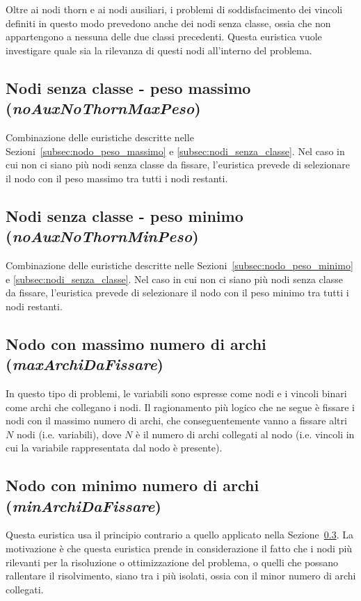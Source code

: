Oltre ai nodi thorn e ai nodi ausiliari, i problemi di soddisfacimento dei vincoli definiti in questo modo prevedono anche dei nodi senza classe, ossia che non appartengono a nessuna delle due classi precedenti. Questa euristica vuole investigare quale sia la rilevanza di questi nodi all'interno del problema.

\subsection{Nodi senza classe - peso massimo (\textit{noAuxNoThornMaxPeso})}

Combinazione delle euristiche descritte nelle Sezioni~\ref{subsec:nodo_peso_massimo} e \ref{subsec:nodi_senza_classe}. Nel caso in cui non ci siano più nodi senza classe da fissare, l'euristica prevede di selezionare il nodo con il peso massimo tra tutti i nodi restanti.

\subsection{Nodi senza classe - peso minimo (\textit{noAuxNoThornMinPeso})}

Combinazione delle euristiche descritte nelle Sezioni~\ref{subsec:nodo_peso_minimo} e \ref{subsec:nodi_senza_classe}. Nel caso in cui non ci siano più nodi senza classe da fissare, l'euristica prevede di selezionare il nodo con il peso minimo tra tutti i nodi restanti.

\subsection{Nodo con massimo numero di archi (\textit{maxArchiDaFissare})}\label{subsec:nodo_massimo_numero_archi}

In questo tipo di problemi, le variabili sono espresse come nodi e i vincoli binari come archi che collegano i nodi. Il ragionamento più logico che ne segue è fissare i nodi con il massimo numero di archi, che conseguentemente vanno a fissare altri $N$ nodi (i.e. variabili), dove $N$ è il numero di archi collegati al nodo (i.e. vincoli in cui la variabile rappresentata dal nodo è presente).

\subsection{Nodo con minimo numero di archi (\textit{minArchiDaFissare})}

Questa euristica usa il principio contrario a quello applicato nella Sezione~\ref{subsec:nodo_massimo_numero_archi}. La motivazione è che questa euristica prende in considerazione il fatto che i nodi più rilevanti per la risoluzione o ottimizzazione del problema, o quelli che possano rallentare il risolvimento, siano tra i più isolati, ossia con il minor numero di archi collegati.